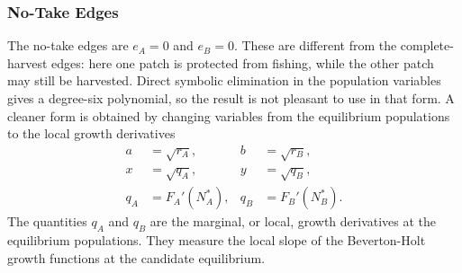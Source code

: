 \documentclass{article}
\numberwithin{equation}{section}
\begin{document}
\subsubsection{No-Take Edges}
The no-take edges are $e_A=0$ and $e_B=0$. These are different from the
complete-harvest edges: here one patch is protected from fishing, while
the other patch may still be harvested. Direct symbolic elimination in
the population variables gives a degree-six polynomial, so the result is
not pleasant to use in that form. A cleaner form is obtained by changing
variables from the equilibrium populations to the local growth
derivatives
\begin{equation*}
    \begin{aligned}
        a&=\sqrt{r_A},
        &
        b&=\sqrt{r_B},\\
        x&=\sqrt{q_A},
        &
        y&=\sqrt{q_B},\\
        q_A&=F_A'(N_A^*),
        &
        q_B&=F_B'(N_B^*).
    \end{aligned}
\end{equation*}
The quantities $q_A$ and $q_B$ are the marginal, or local, growth
derivatives at the equilibrium populations. They measure the local slope
of the Beverton-Holt growth functions at the candidate equilibrium.
\end{document}
